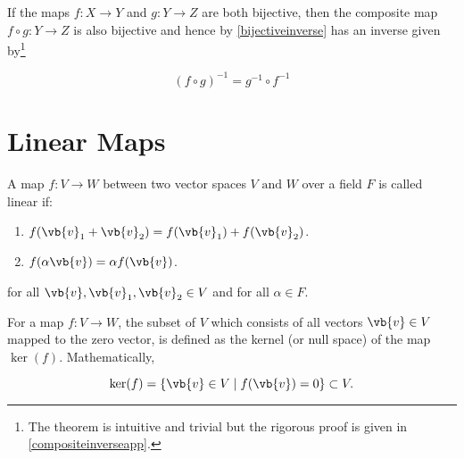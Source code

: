 \documentclass[a4paper,12pt]{report}
\begin{document}
\begin{theorem}  \label{compositeinversetheo} 
If the maps \(f: X \rightarrow Y\) and \(g: Y \rightarrow Z\) are both bijective, then the composite map \(f \circ g: Y \rightarrow Z\) is also bijective and hence by \cref{bijectiveinverse} has an inverse given by\footnote{The theorem is intuitive and trivial but the rigorous proof is given in \cref{compositeinverseapp}.}

\begin{equation} \label{compositeinverseeq} 
    (f \circ g)^{-1} = g^{-1} \circ f^{-1} 
\end{equation}

\end{theorem}


\section{Linear Maps}

\begin{definition} \label{linearmap} 
A map \(f:V \rightarrow W\) between two vector spaces \(V \text { and }  W\) over a field \(F\) is called linear if:

\begin{enumerate}[label=(\(E\)\arabic*)]
    \item \(f(\vb{v} _{1} + \vb{v} _{2}  ) = f(\vb{v} _{1} ) + f(\vb{v} _{2} )\).
    \item \(f(\alpha \vb{v} ) = \alpha f(\vb{v} )\).
\end{enumerate}

for all \(\vb{v} ,\vb{v} _{1}, \vb{v} _{2}\in V  \) and for all \(\alpha \in  F\). 

\end{definition}

\begin{definition}
For a map \(f: V \rightarrow W\), the subset of \(V\) which consists of all vectors \(\vb{v} \in V\) mapped to the zero vector, is defined as the kernel (or null space) of the map \(\ker (f)\). Mathematically,
    
\begin{equation}
    \ker (f) = \left\{ \vb{v} \in V \mid f(\vb{v} )=0 \right\} \subset V.
\end{equation}
    
\end{definition}
\end{document}
